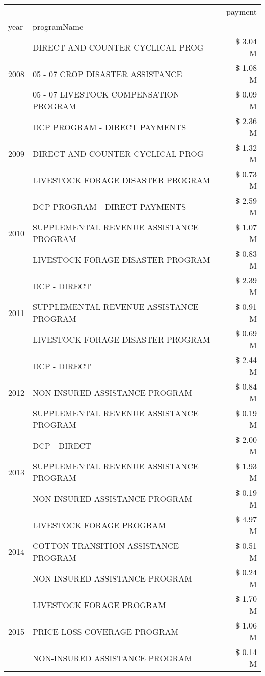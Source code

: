 \begin{tabular}{llr}
\toprule
 &  & payment \\
year & programName &  \\
\midrule
\multirow[t]{3}{*}{2008} & DIRECT AND COUNTER CYCLICAL PROG & \$ 3.04 M \\
 & 05 - 07 CROP DISASTER ASSISTANCE & \$ 1.08 M \\
 & 05 - 07 LIVESTOCK COMPENSATION PROGRAM & \$ 0.09 M \\
\cline{1-3}
\multirow[t]{3}{*}{2009} & DCP PROGRAM - DIRECT PAYMENTS & \$ 2.36 M \\
 & DIRECT AND COUNTER CYCLICAL PROG & \$ 1.32 M \\
 & LIVESTOCK FORAGE DISASTER  PROGRAM & \$ 0.73 M \\
\cline{1-3}
\multirow[t]{3}{*}{2010} & DCP PROGRAM - DIRECT PAYMENTS & \$ 2.59 M \\
 & SUPPLEMENTAL REVENUE ASSISTANCE PROGRAM & \$ 1.07 M \\
 & LIVESTOCK FORAGE DISASTER  PROGRAM & \$ 0.83 M \\
\cline{1-3}
\multirow[t]{3}{*}{2011} & DCP - DIRECT & \$ 2.39 M \\
 & SUPPLEMENTAL REVENUE ASSISTANCE PROGRAM & \$ 0.91 M \\
 & LIVESTOCK FORAGE DISASTER PROGRAM & \$ 0.69 M \\
\cline{1-3}
\multirow[t]{3}{*}{2012} & DCP - DIRECT & \$ 2.44 M \\
 & NON-INSURED ASSISTANCE PROGRAM & \$ 0.84 M \\
 & SUPPLEMENTAL REVENUE ASSISTANCE PROGRAM & \$ 0.19 M \\
\cline{1-3}
\multirow[t]{3}{*}{2013} & DCP - DIRECT & \$ 2.00 M \\
 & SUPPLEMENTAL REVENUE ASSISTANCE PROGRAM & \$ 1.93 M \\
 & NON-INSURED ASSISTANCE PROGRAM & \$ 0.19 M \\
\cline{1-3}
\multirow[t]{3}{*}{2014} & LIVESTOCK FORAGE PROGRAM & \$ 4.97 M \\
 & COTTON TRANSITION ASSISTANCE PROGRAM & \$ 0.51 M \\
 & NON-INSURED ASSISTANCE PROGRAM & \$ 0.24 M \\
\cline{1-3}
\multirow[t]{3}{*}{2015} & LIVESTOCK FORAGE PROGRAM & \$ 1.70 M \\
 & PRICE LOSS COVERAGE PROGRAM & \$ 1.06 M \\
 & NON-INSURED ASSISTANCE PROGRAM & \$ 0.14 M \\

\end{tabular}

